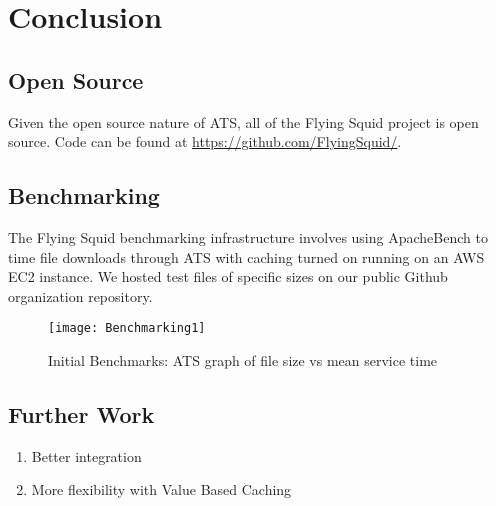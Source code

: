 \section{Conclusion}

\subsection{Open Source}

Given the open source nature of ATS, all of the Flying Squid project is open source. Code can be found at \url{https://github.com/FlyingSquid/}.

\subsection{Benchmarking}

The Flying Squid  benchmarking infrastructure involves using ApacheBench to time file downloads through ATS with caching turned on running on an AWS EC2 instance. We hosted test files of specific sizes on our public Github organization repository.

\begin{figure}[H] \centering
\texttt{[image: Benchmarking1]}
\caption{Initial Benchmarks: ATS graph of file size vs mean service time}
\end{figure}


\subsection{Further Work}

\begin{enumerate}

\item Better integration

\item  More flexibility with Value Based Caching

\end{enumerate}

